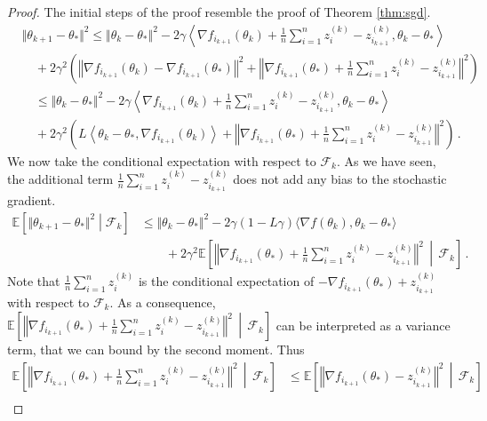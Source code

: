 \documentclass[11pt,reqno]{article}
\newcommand{\E}{\mathbb{E}}
\newcommand{\cF}{\mathcal{F}}
\renewcommand{\leq}{\leqslant}
\numberwithin{equation}{section}
\theoremstyle{plain}
\theoremstyle{definition}
\theoremstyle{remark}
\begin{document}
\begin{proof}
	The initial steps of the proof resemble the proof of Theorem \ref{thm:sgd}. 
	\begin{align*}
		&\Vert \theta_{k+1} - \theta_* \Vert^2 \leq \Vert \theta_k - \theta_* \Vert^2 - 2\gamma \left\langle \nabla f_{i_{k+1}}(\theta_k) + \frac{1}{n} \sum_{i=1}^{n} z_i^{(k)} - z^{(k)}_{i_{k+1}}, \theta_k - \theta_* \right\rangle \\
		&\quad+ 2\gamma^2 \left(\left\Vert \nabla f_{i_{k+1}}(\theta_k) - \nabla f_{i_{k+1}}(\theta_*)\right\Vert^2 + \left\Vert \nabla f_{i_{k+1}}(\theta_*) + \frac{1}{n} \sum_{i=1}^{n} z_i^{(k)} - z^{(k)}_{i_{k+1}}\right\Vert^2\right) \\
		&\quad\leq \Vert \theta_k - \theta_* \Vert^2 - 2\gamma \left\langle \nabla f_{i_{k+1}}(\theta_k) + \frac{1}{n} \sum_{i=1}^{n} z_i^{(k)} - z^{(k)}_{i_{k+1}}, \theta_k - \theta_* \right\rangle \\
		&\quad+ 2\gamma^2 \left(L\left\langle \theta_k - \theta_*, \nabla f_{i_{k+1}}(\theta_k)\right\rangle + \left\Vert \nabla f_{i_{k+1}}(\theta_*) + \frac{1}{n} \sum_{i=1}^{n} z_i^{(k)} - z^{(k)}_{i_{k+1}}\right\Vert^2\right) \, .
	\end{align*}
We now take the conditional expectation with respect to $\cF_k$. As we have seen, the additional term $\frac{1}{n} \sum_{i=1}^{n} z_i^{(k)} - z^{(k)}_{i_{k+1}}$ does not add any bias to the stochastic gradient. 
\begin{align*}
	\E\left[\Vert \theta_{k+1} - \theta_* \Vert^2 \middle\vert \cF_k\right] &\leq \Vert \theta_k - \theta_* \Vert^2 - 2\gamma(1-L\gamma) \langle \nabla f(\theta_k), \theta_k - \theta_* \rangle \\
	&\qquad+ 2\gamma^2 \E \left[\left\Vert \nabla f_{i_{k+1}}(\theta_*) + \frac{1}{n} \sum_{i=1}^{n} z_i^{(k)} - z^{(k)}_{i_{k+1}}\right\Vert^2 \, \middle\vert \, \cF_k\right] \, . 
\end{align*}
Note that $\frac{1}{n} \sum_{i=1}^{n} z_i^{(k)}$ is the conditional expectation of $-\nabla f_{i_{k+1}}(\theta_*) + z^{(k)}_{i_{k+1}}$ with respect to $\cF_k$. As a consequence, $\E \left[\left\Vert \nabla f_{i_{k+1}}(\theta_*) + \frac{1}{n} \sum_{i=1}^{n} z_i^{(k)} - z^{(k)}_{i_{k+1}}\right\Vert^2 \, \middle\vert \, \cF_k\right]$ can be interpreted as a variance term, that we can bound by the second moment. Thus 
\begin{align*}
	\E \left[\left\Vert \nabla f_{i_{k+1}}(\theta_*) + \frac{1}{n} \sum_{i=1}^{n} z_i^{(k)} - z^{(k)}_{i_{k+1}}\right\Vert^2 \, \middle\vert \, \cF_k\right] &\leq \E \left[\left\Vert \nabla f_{i_{k+1}}(\theta_*) - z^{(k)}_{i_{k+1}}\right\Vert^2 \, \middle\vert \, \cF_k\right] \\

\end{align*}
\end{proof}
\end{document}
